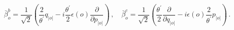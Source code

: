 \begin{equation}
\bar{\beta}_{o}^{b}={\frac{1}{\sqrt{2}}}\left( {\frac{2}{\theta ^{\prime }}}
q_{|o|}-i{\frac{\theta ^{\prime }}{2}}\epsilon (o){\frac{\partial }{\partial
p_{|o|}}}\right) \,,\quad \bar{\beta}_{o}^{c}={\frac{1}{\sqrt{2}}}\left( {
\frac{\theta ^{\prime }}{2}}{\frac{\partial }{\partial q_{|o|}}}-i\epsilon
(o){\frac{2}{\theta ^{\prime }}}p_{|o|}\right) \,.
\end{equation}

